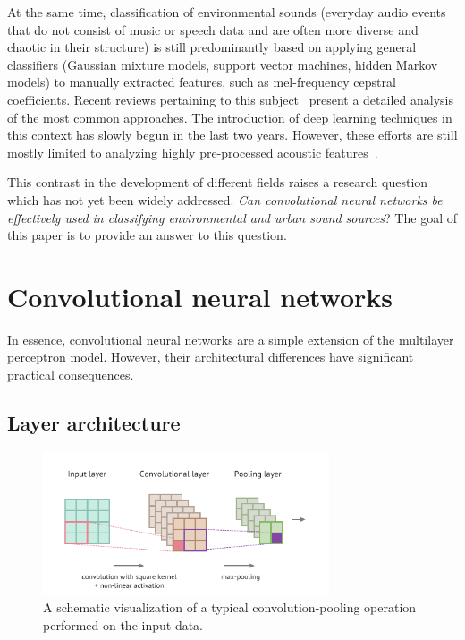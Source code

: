\documentclass{article}
\begin{document}
At the same time, classification of environmental sounds (everyday audio events that do not consist of music or speech data and are often more diverse and chaotic in their structure) is still predominantly based on applying general classifiers (Gaussian mixture models, support vector machines, hidden Markov models) to manually extracted features, such as mel-frequency cepstral coefficients. Recent reviews pertaining to this subject~\cite{barchiesi2015acoustic, chachada2014environmental} present a detailed analysis of the most common approaches. The introduction of deep learning techniques in this context has slowly begun in the last two years. However, these efforts are still mostly limited to analyzing highly pre-processed acoustic features~\cite{asgari2014inferring, kons2013audio, ravanelli2014audio, gencoglu2014recognition, xue2015auditory}.

This contrast in the development of different fields raises a research question which has not yet been widely addressed. \textit{Can convolutional neural networks be effectively used in classifying environmental and urban sound sources}? The goal of this paper is to provide an answer to this question.

\vspace{-6pt}

\section{Convolutional neural networks}

In essence, convolutional neural networks are a simple extension of the multilayer perceptron model. However, their architectural differences have significant practical consequences.

\vspace{-6pt}

\subsection{Layer architecture}

\begin{figure}
\centering
\includegraphics[width=20pc]{Figures/ConvLayer.pdf}
\caption{\label{fig:convolutional-layer}A schematic visualization of a typical convolution-pooling operation performed on the input data.}
\end{figure}
\end{document}

